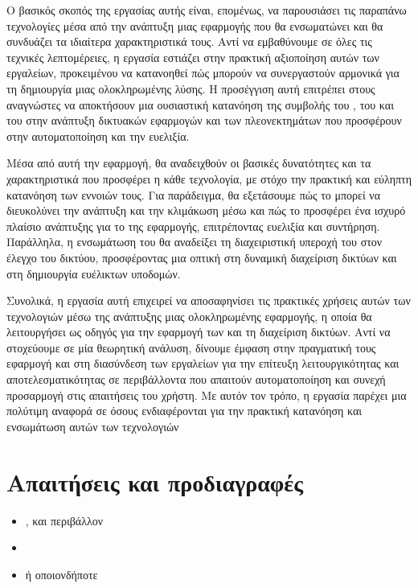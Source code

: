 Ο βασικός σκοπός της εργασίας αυτής είναι, επομένως, να παρουσιάσει τις παραπάνω τεχνολογίες μέσα από την ανάπτυξη μιας εφαρμογής που 
θα ενσωματώνει και θα συνδυάζει τα ιδιαίτερα χαρακτηριστικά τους. Αντί να εμβαθύνουμε σε όλες τις τεχνικές λεπτομέρειες, η εργασία 
εστιάζει στην πρακτική αξιοποίηση αυτών των εργαλείων, προκειμένου να κατανοηθεί πώς μπορούν να συνεργαστούν αρμονικά για τη 
δημιουργία μιας ολοκληρωμένης λύσης. Η προσέγγιση αυτή επιτρέπει στους αναγνώστες να αποκτήσουν μια ουσιαστική κατανόηση της συμβολής του , 
του  και του  στην ανάπτυξη δικτυακών εφαρμογών και των πλεονεκτημάτων που προσφέρουν στην αυτοματοποίηση και την ευελιξία.

Μέσα από αυτή την εφαρμογή, θα αναδειχθούν οι βασικές δυνατότητες και τα χαρακτηριστικά που προσφέρει η κάθε τεχνολογία, 
με στόχο την πρακτική και εύληπτη κατανόηση των εννοιών τους. Για παράδειγμα, θα εξετάσουμε πώς το  
μπορεί να διευκολύνει την ανάπτυξη και την κλιμάκωση  μέσω  και πώς το  
προσφέρει ένα ισχυρό πλαίσιο ανάπτυξης για το  της εφαρμογής, επιτρέποντας ευελιξία και συντήρηση. Παράλληλα, η ενσωμάτωση του 
 θα αναδείξει τη διαχειριστική υπεροχή του στον έλεγχο του δικτύου, προσφέροντας μια οπτική στη δυναμική διαχείριση δικτύων και στη δημιουργία 
 ευέλικτων υποδομών.

Συνολικά, η εργασία αυτή επιχειρεί να αποσαφηνίσει τις πρακτικές χρήσεις αυτών των τεχνολογιών μέσω της ανάπτυξης μιας 
ολοκληρωμένης εφαρμογής, η οποία θα λειτουργήσει ως οδηγός για την εφαρμογή των  
και τη διαχείριση δικτύων. Αντί να στοχεύουμε σε μία θεωρητική ανάλυση, δίνουμε έμφαση στην πραγματική τους εφαρμογή και στη 
διασύνδεση των εργαλείων για την επίτευξη λειτουργικότητας και αποτελεσματικότητας σε περιβάλλοντα που απαιτούν αυτοματοποίηση 
και συνεχή προσαρμογή στις απαιτήσεις του χρήστη. Με αυτόν τον τρόπο, η εργασία παρέχει μια πολύτιμη αναφορά σε όσους ενδιαφέρονται 
για την πρακτική κατανόηση και ενσωμάτωση αυτών των τεχνολογιών

\section{Απαιτήσεις και προδιαγραφές}
\begin{itemize}
    \item {} ,  και  περιβάλλον
    \item {}
    \item {} ή οποιονδήποτε 
\end{itemize}

